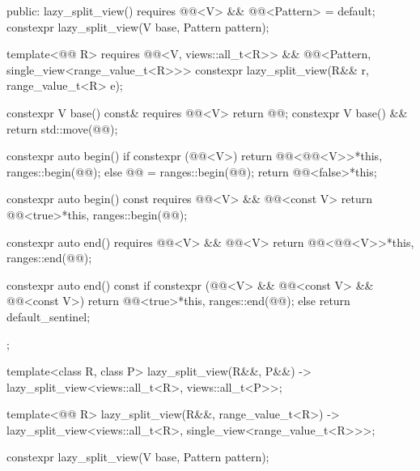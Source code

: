 \begin{codeblock}
{{  public:
    lazy_split_view()
      requires @@<V> && @@<Pattern> = default;
    constexpr lazy_split_view(V base, Pattern pattern);

    template<@@ R>
      requires @@<V, views::all_t<R>> &&
               @@<Pattern, single_view<range_value_t<R>>>
    constexpr lazy_split_view(R&& r, range_value_t<R> e);

    constexpr V base() const& requires @@<V> { return @@; }
    constexpr V base() && { return std::move(@@); }

    constexpr auto begin() {
      if constexpr (@@<V>)
        return @@<@@<V>>{*this, ranges::begin(@@)};
      else {
        @@ = ranges::begin(@@);
        return @@<false>{*this};
      }
    }

    constexpr auto begin() const requires @@<V> && @@<const V> {
      return @@<true>{*this, ranges::begin(@@)};
    }

    constexpr auto end() requires @@<V> && @@<V> {
      return @@<@@<V>>{*this, ranges::end(@@)};
    }

    constexpr auto end() const {
      if constexpr (@@<V> && @@<const V> && @@<const V>)
        return @@<true>{*this, ranges::end(@@)};
      else
        return default_sentinel;
    }
  };

  template<class R, class P>
    lazy_split_view(R&&, P&&) -> lazy_split_view<views::all_t<R>, views::all_t<P>>;

  template<@@ R>
    lazy_split_view(R&&, range_value_t<R>)
      -> lazy_split_view<views::all_t<R>, single_view<range_value_t<R>>>;
}
\end{codeblock}

%
\begin{itemdecl}
constexpr lazy_split_view(V base, Pattern pattern);
\end{itemdecl}

